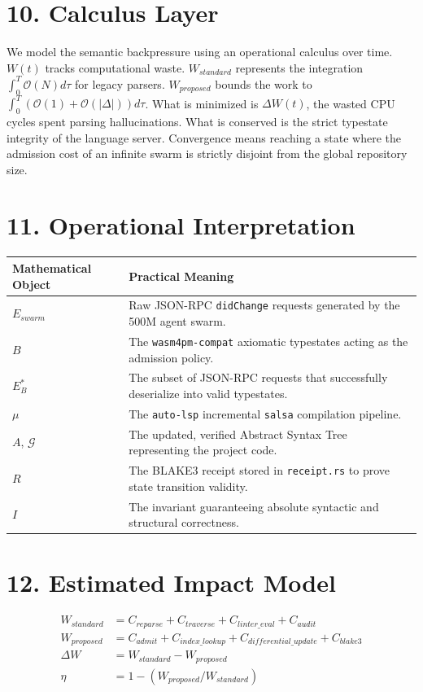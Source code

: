 \section{10. Calculus Layer}
We model the semantic backpressure using an operational calculus over time. $W(t)$ tracks computational waste. $W_{standard}$ represents the integration $\int_0^T \mathcal{O}(N) d\tau$ for legacy parsers. $W_{proposed}$ bounds the work to $\int_0^T (\mathcal{O}(1) + \mathcal{O}(|\Delta|)) d\tau$. What is minimized is $\Delta W(t)$, the wasted CPU cycles spent parsing hallucinations. What is conserved is the strict typestate integrity of the language server. Convergence means reaching a state where the admission cost of an infinite swarm is strictly disjoint from the global repository size.

\section{11. Operational Interpretation}
\begin{table}[h]
\centering
\begin{tabular}{|l|p{12cm}|}
\hline
\textbf{Mathematical Object} & \textbf{Practical Meaning} \\ \hline
$E_{swarm}$ & Raw JSON-RPC \texttt{didChange} requests generated by the 500M agent swarm. \\ \hline
$B$ & The \texttt{wasm4pm-compat} axiomatic typestates acting as the admission policy. \\ \hline
$E_B^*$ & The subset of JSON-RPC requests that successfully deserialize into valid typestates. \\ \hline
$\mu$ & The \texttt{auto-lsp} incremental \texttt{salsa} compilation pipeline. \\ \hline
$A$, $\mathcal{G}$ & The updated, verified Abstract Syntax Tree representing the project code. \\ \hline
$R$ & The BLAKE3 receipt stored in \texttt{receipt.rs} to prove state transition validity. \\ \hline
$I$ & The invariant guaranteeing absolute syntactic and structural correctness. \\ \hline
\end{tabular}
\end{table}

\section{12. Estimated Impact Model}
\begin{align*}
W_{standard} &= C_{reparse} + C_{traverse} + C_{linter\_eval} + C_{audit} \\
W_{proposed} &= C_{admit} + C_{index\_lookup} + C_{differential\_update} + C_{blake3} \\
\Delta W &= W_{standard} - W_{proposed} \\
\eta &= 1 - \left( W_{proposed} / W_{standard} \right)
\end{align*}


